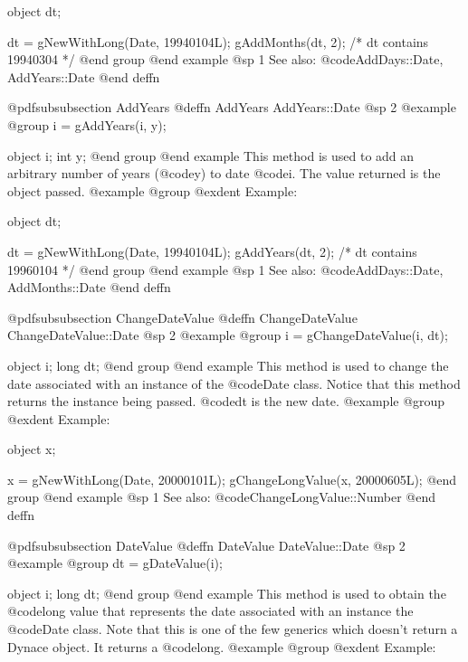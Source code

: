 object  dt;

dt = gNewWithLong(Date, 19940104L);
gAddMonths(dt, 2);   /*  dt contains 19940304  */
@end group
@end example
@sp 1
See also:  @code{AddDays::Date, AddYears::Date}
@end deffn











@pdfsubsubsection {AddYears}
@deffn {AddYears} AddYears::Date
@sp 2
@example
@group
i = gAddYears(i, y);

object  i;
int     y;
@end group
@end example
This method is used to add an arbitrary number of years (@code{y}) to
date @code{i}.  The value returned is the object passed.
@example
@group
@exdent Example:

object  dt;

dt = gNewWithLong(Date, 19940104L);
gAddYears(dt, 2);   /*  dt contains 19960104  */
@end group
@end example
@sp 1
See also:  @code{AddDays::Date, AddMonths::Date}
@end deffn










@pdfsubsubsection {ChangeDateValue}
@deffn {ChangeDateValue} ChangeDateValue::Date
@sp 2
@example
@group
i = gChangeDateValue(i, dt);

object  i;
long    dt;
@end group
@end example
This method is used to change the date associated with an instance of
the @code{Date} class.  Notice that this method returns the instance
being passed.  @code{dt} is the new date.
@example
@group
@exdent Example:

object  x;

x = gNewWithLong(Date, 20000101L);
gChangeLongValue(x, 20000605L);
@end group
@end example
@sp 1
See also:  @code{ChangeLongValue::Number}
@end deffn







@pdfsubsubsection {DateValue}
@deffn {DateValue} DateValue::Date
@sp 2
@example
@group
dt = gDateValue(i);

object  i;
long    dt;
@end group
@end example
This method is used to obtain the @code{long} value that represents
the date associated with an instance the @code{Date} class.  Note that
this is one of the few generics which doesn't return a Dynace object.
It returns a @code{long}.
@example
@group
@exdent Example:

